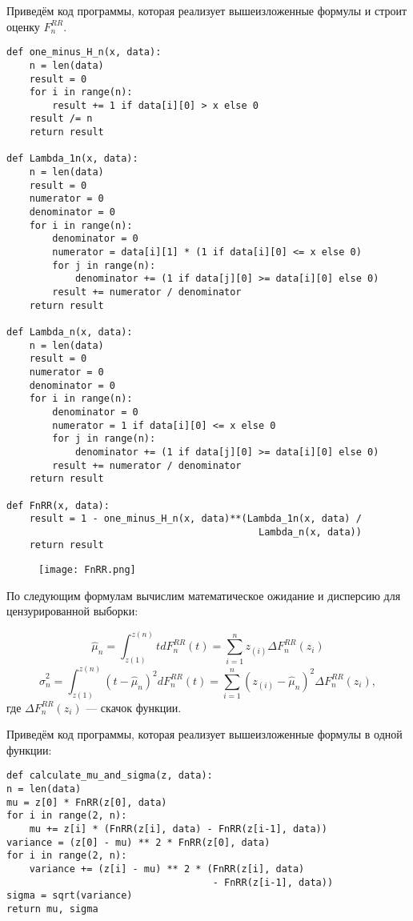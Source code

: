Приведём код программы, которая реализует вышеизложенные формулы и строит оценку $F_n^{RR}$.
\begin{verbatim}
def one_minus_H_n(x, data):
    n = len(data)
    result = 0
    for i in range(n):
        result += 1 if data[i][0] > x else 0
    result /= n
    return result

def Lambda_1n(x, data):
    n = len(data)
    result = 0
    numerator = 0
    denominator = 0
    for i in range(n):
        denominator = 0
        numerator = data[i][1] * (1 if data[i][0] <= x else 0)
        for j in range(n):
            denominator += (1 if data[j][0] >= data[i][0] else 0)
        result += numerator / denominator
    return result

def Lambda_n(x, data):
    n = len(data)
    result = 0
    numerator = 0
    denominator = 0
    for i in range(n):
        denominator = 0
        numerator = 1 if data[i][0] <= x else 0
        for j in range(n):
            denominator += (1 if data[j][0] >= data[i][0] else 0)
        result += numerator / denominator
    return result

def FnRR(x, data):
    result = 1 - one_minus_H_n(x, data)**(Lambda_1n(x, data) /
                                            Lambda_n(x, data))
    return result
\end{verbatim}

\begin{figure}[h]
    \begin{center}
        \texttt{[image: FnRR.png]}
        \caption{}
        \label{ris:experimcoded}
    \end{center}
\end{figure}

По следующим формулам вычислим математическое ожидание и дисперсию для цензурированной выборки:

$$\hat{\mu}_n = \int_{z(1)}^{z(n)} tdF_n^{RR} (t) = \sum_{i=1}^{n} z_{(i)} \Delta F_n^{RR} (z_i) $$
$$\hat{\sigma}_n^2 = \int_{z(1)}^{z(n)} (t - \hat{\mu}_n)^2 dF_n^{RR} (t) = \sum_{i=1}^{n} (z_{(i)} - \hat{\mu}_n)^2 \Delta F_n^{RR} (z_i),$$
где $\Delta F_n^{RR} (z_i)$ --- скачок функции.

Приведём код программы, которая реализует вышеизложенные формулы в одной функции:
\begin{verbatim}
def calculate_mu_and_sigma(z, data):
n = len(data)
mu = z[0] * FnRR(z[0], data)
for i in range(2, n):
    mu += z[i] * (FnRR(z[i], data) - FnRR(z[i-1], data))
variance = (z[0] - mu) ** 2 * FnRR(z[0], data)
for i in range(2, n):
    variance += (z[i] - mu) ** 2 * (FnRR(z[i], data)
                                    - FnRR(z[i-1], data))
sigma = sqrt(variance)
return mu, sigma
\end{verbatim}
